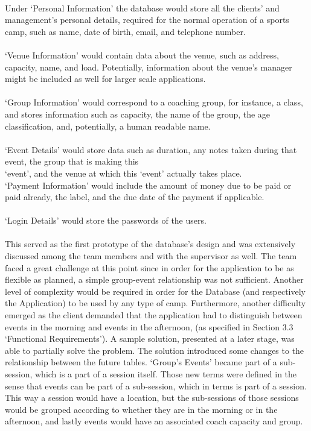 \documentclass{l3proj}
\begin{document}
\\Under `Personal Information' the database would store all the clients' and management's personal details, required for the normal operation of a sports camp, such as name, date of birth, email, and telephone number.\\
\\`Venue Information' would contain data about the venue, such as address, capacity, name, and load. Potentially, information about the venue's manager might be included as well for larger scale applications.\\
\\`Group Information' would correspond to a coaching group, for instance, a class, and stores information such as capacity, the name of the group, the age classification, and, potentially, a human readable name.\\
\\`Event Details' would store data such as duration, any notes taken during that event, the group that is making this \\`event', and the venue at which this `event' actually takes place.\\
`Payment Information' would include the amount of money due to be paid or paid already, the label, and the due date of the payment if applicable.\\
\\`Login Details' would store the passwords of the users.\\
\\This served as the first prototype of the database's design and was extensively discussed among the team members and with the supervisor as well. The team faced a great challenge at this point since in order for the application to be as flexible as planned, a simple group-event relationship was not sufficient. Another level of complexity would be required in order for the Database (and respectively the Application) to be used by any type of camp. Furthermore, another difficulty emerged as the client demanded that the application had to distinguish between events in the morning and events in the afternoon, (as specified in Section 3.3 `Functional Requirements'). A sample solution, presented at a later stage, was able to partially solve the problem. The solution introduced some changes to the relationship between the future tables. `Group's Events' became part of a sub-session, which is a part of a session itself. Those new terms were defined in the sense that events can be part of a sub-session, which in terms is part of a session. This way a session would have a location, but the sub-sessions of those sessions would be grouped according to whether they are in the morning or in the afternoon, and lastly events would have an associated coach capacity and group.\\
\end{document}

